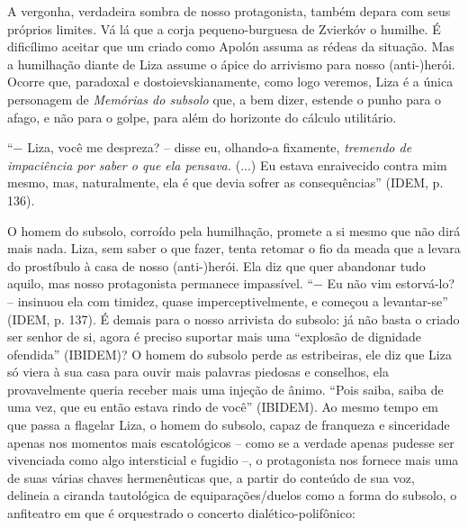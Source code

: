 A vergonha, verdadeira sombra de nosso protagonista, também depara com
seus próprios limites. Vá lá que a corja pequeno-burguesa de Zvierkóv o
humilhe. É dificílimo aceitar que um criado como Apolón assuma as rédeas
da situação. Mas a humilhação diante de Liza assume o ápice do arrivismo
para nosso (anti-)herói. Ocorre que, paradoxal e dostoievskianamente,
como logo veremos, Liza é a única personagem de \emph{Memórias do
subsolo} que, a bem dizer, estende o punho para o afago, e não para o
golpe, para além do horizonte do cálculo utilitário.

``− Liza, você me despreza? -- disse eu, olhando-a fixamente,
\emph{tremendo de impaciência por saber o que ela pensava.} (...) Eu
estava enraivecido contra mim mesmo, mas, naturalmente, ela é que devia
sofrer as consequências'' (IDEM, p. 136).

O homem do subsolo, corroído pela humilhação, promete a si mesmo que não
dirá mais nada. Liza, sem saber o que fazer, tenta retomar o fio da
meada que a levara do prostíbulo à casa de nosso (anti-)herói. Ela diz
que quer abandonar tudo aquilo, mas nosso protagonista permanece
impassível. ``− Eu não vim estorvá-lo? -- insinuou ela com timidez,
quase imperceptivelmente, e começou a levantar-se'' (IDEM, p. 137). É
demais para o nosso arrivista do subsolo: já não basta o criado ser
senhor de si, agora é preciso suportar mais uma ``explosão de dignidade
ofendida'' (IBIDEM)? O homem do subsolo perde as estribeiras, ele diz
que Liza só viera à sua casa para ouvir mais palavras piedosas e
conselhos, ela provavelmente queria receber mais uma injeção de ânimo.
``Pois saiba, saiba de uma vez, que eu então estava rindo de você''
(IBIDEM). Ao mesmo tempo em que passa a flagelar Liza, o homem do
subsolo, capaz de franqueza e sinceridade apenas nos momentos mais
escatológicos -- como se a verdade apenas pudesse ser vivenciada como
algo intersticial e fugidio --, o protagonista nos fornece mais uma de
suas várias chaves hermenêuticas que, a partir do conteúdo de sua voz,
delineia a ciranda tautológica de equiparações/duelos como a forma do
subsolo, o anfiteatro em que é orquestrado o concerto
dialético-polifônico:

